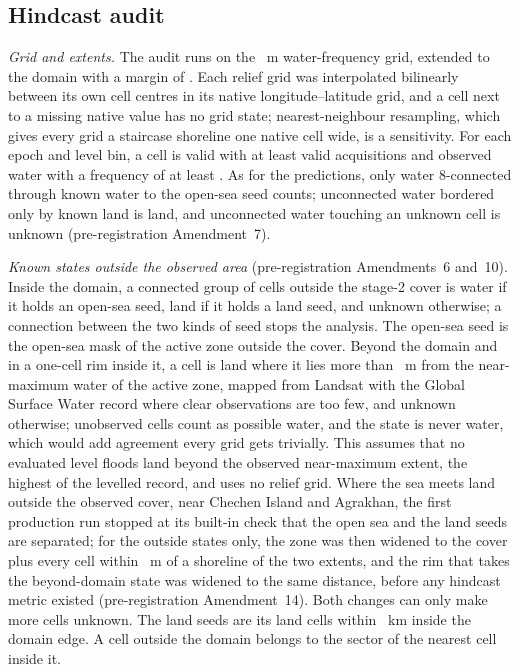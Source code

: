 
\subsection*{Hindcast audit}
\emph{Grid and extents.} The audit runs on the ~m water-frequency grid, extended to the domain with a margin of \textdegree{}. Each relief grid was interpolated bilinearly between its own cell centres in its native longitude--latitude grid, and a cell next to a missing native value has no grid state; nearest-neighbour resampling, which gives every grid a staircase shoreline one native cell wide, is a sensitivity. For each epoch and level bin, a cell is valid with at least  valid acquisitions and observed water with a frequency of at least . As for the predictions, only water 8-connected through known water to the open-sea seed counts; unconnected water bordered only by known land is land, and unconnected water touching an unknown cell is unknown (pre-registration Amendment~7).

\emph{Known states outside the observed area} (pre-registration Amendments~6 and~10). Inside the domain, a connected group of cells outside the stage-2 cover is water if it holds an open-sea seed, land if it holds a land seed, and unknown otherwise; a connection between the two kinds of seed stops the analysis. The open-sea seed is the open-sea mask of the active zone outside the cover. Beyond the domain and in a one-cell rim inside it, a cell is land where it lies more than ~m from the  near-maximum water of the active zone, mapped from Landsat with the Global Surface Water record where clear observations are too few\citep{pekel2016}, and unknown otherwise; unobserved cells count as possible water, and the state is never water, which would add agreement every grid gets trivially. This assumes that no evaluated level floods land beyond the observed near-maximum extent, the highest of the levelled record, and uses no relief grid. Where the sea meets land outside the observed cover, near Chechen Island and Agrakhan, the first production run stopped at its built-in check that the open sea and the land seeds are separated; for the outside states only, the zone was then widened to the cover plus every cell within ~m of a shoreline of the two extents, and the rim that takes the beyond-domain state was widened to the same distance, before any hindcast metric existed (pre-registration Amendment~14). Both changes can only make more cells unknown. The land seeds are its land cells within ~km inside the domain edge. A cell outside the domain belongs to the sector of the nearest cell inside it.

